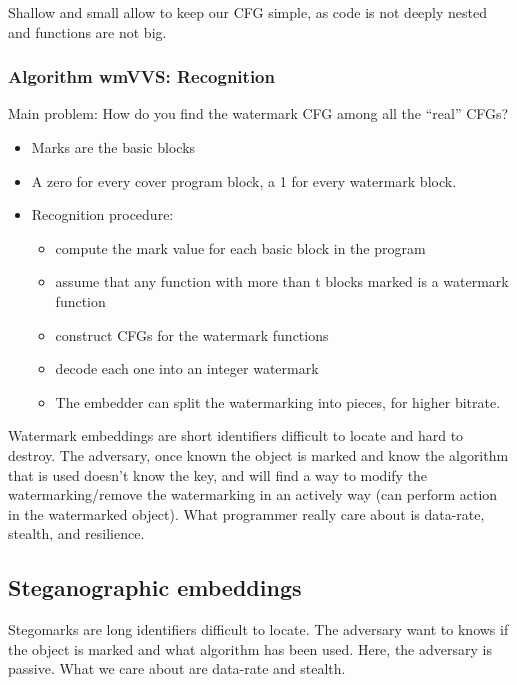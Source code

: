 Shallow and small allow to keep our CFG simple, as code is not deeply nested and functions are not big. 

\subsubsection{Algorithm wmVVS: Recognition}

Main problem: How do you find the watermark CFG among all the “real” CFGs?
\begin{itemize}
    \item Marks are the basic blocks
    \item A zero for every cover program block, a 1 for every watermark block.
    \item Recognition procedure:
    \begin{itemize}
        \item compute the mark value for each basic block in the program
        \item assume that any function with more than t blocks marked is a watermark function
        \item construct CFGs for the watermark functions
        \item decode each one into an integer watermark
        \item The embedder can split the watermarking into pieces, for higher bitrate.
    \end{itemize}
\end{itemize}

Watermark embeddings are short identifiers difficult to locate and hard to destroy. 
The adversary, once known the object is marked and know the algorithm that is used doesn't know the key, and will find a way to modify the watermarking/remove the watermarking in an actively way (can perform action in the watermarked object).\newline
What programmer really care about is data-rate, stealth, and resilience. 

\subsection{Steganographic embeddings}

Stegomarks are long identifiers difficult to locate.\newline 
The adversary want to knows if the object is marked and what algorithm has been used. 
Here, the adversary is passive. \newline
What we care about are data-rate and stealth.

